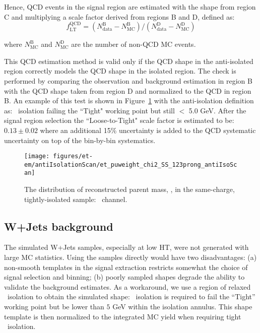 Hence, QCD events in the signal region are estimated with the shape from region C 
and multiplying a scale factor derived from regions B and D, defined as:
\begin{equation}\label{eq:et_qcd_sf}
f_\mathrm{LT}^\mathrm{QCD} = \left(N_\mathrm{data}^\mathrm{B} - N_\mathrm{MC}^\mathrm{B}\right)
/ \left(N_\mathrm{data}^\mathrm{D} -
N_\mathrm{MC}^\mathrm{D}\right)
\end{equation}

\noindent where $N_\mathrm{MC}^\mathrm{B}$ and $N_\mathrm{MC}^\mathrm{D}$ are the number of non-QCD MC events.

This QCD estimation method is valid only if the QCD shape in the
anti-isolated region correctly models the QCD shape in the isolated
region. The check is performed by comparing the observation and background
estimation in region B with the QCD shape taken from region D and
normalized to the QCD in region B.  An example of this test is shown
in Figure~\ref{fig:et_sst} with the anti-isolation
definition as: \tauh ~isolation failing the ``Tight" working point but
still $<$ 5.0 GeV. After the signal region selection the ``Loose-to-Tight" scale factor is estimated
to be: $0.13 \pm 0.02$ where an additional 15\% uncertainty is added to the QCD systematic uncertainty 
on top of the bin-by-bin systematics.

\begin{figure}[thbp!]\centering
  \texttt{[image: figures/et-em/antiIsolationScan/et\_puweight\_chi2\_SS\_123prong\_antiIsoScan]} %
  \caption{\label{fig:et_sst} The distribution of reconstructed parent
    mass, \meffetau, in the same-charge, tightly-isolated sample:
    \teth ~channel.}
\end{figure}

\subsection{W+Jets background}
\label{sec:et_w_bkg_validation}

The simulated W+Jets samples, especially at low HT, were not
generated with large MC statistics.  Using the samples directly would
have two disadvantages: (a) non-smooth templates in the
signal extraction restricts somewhat the choice of signal
selection and binning; (b) poorly sampled shapes degrade the
ability to validate the background estimates.  As a workaround, we use
a region of relaxed \tauh ~isolation to obtain the simulated shape:
\tauh ~isolation is required to fail the ``Tight'' working point but be
lower than $5$ GeV within the isolation annulus.  This shape template is then normalized to the
integrated MC yield when requiring tight \tauh ~isolation.

